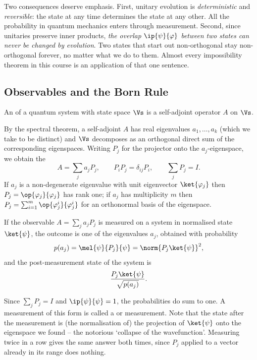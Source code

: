 Two consequences deserve emphasis. First, unitary evolution is \emph{deterministic} and \emph{reversible}: the state at any time determines the state at any other. All the probability in quantum mechanics enters through measurement. Second, since unitaries preserve inner products, \emph{the overlap $\ip{\psi}{\varphi}$ between two states can never be changed by evolution}. Two states that start out non-orthogonal stay non-orthogonal forever, no matter what we do to them. Almost every impossibility theorem in this course is an application of that one sentence.

\subsection{Observables and the Born Rule}

\begin{definition}[Observable]
	An  of a quantum system with state space $\Vs$ is a self-adjoint operator $A$ on $\Vs$.
\end{definition}

By the spectral theorem, a self-adjoint $A$ has real eigenvalues $a_1, \dots, a_k$ (which we take to be distinct) and $\Vs$ decomposes as an orthogonal direct sum of the corresponding eigenspaces. Writing $P_j$ for the projector onto the $a_j$-eigenspace, we obtain the 
$$A = \sum_j a_j P_j, \qquad P_iP_j = \delta_{ij}P_i, \qquad \sum_j P_j = I.$$
If $a_j$ is a non-degenerate eigenvalue with unit eigenvector $\ket{\varphi_j}$ then $P_j = \op{\varphi_j}{\varphi_j}$ has rank one; if $a_j$ has multiplicity $m$ then $P_j = \sum_{i=1}^m \op{\varphi_j^i}{\varphi_j^i}$ for an orthonormal basis of the eigenspace.

\begin{axiom}
	If the observable $A = \sum_j a_j P_j$ is measured on a system in normalised state $\ket{\psi}$, the outcome is one of the eigenvalues $a_j$, obtained with probability
	$$p(a_j) = \mel{\psi}{P_j}{\psi} = \norm{P_j \ket{\psi}}^2,$$
	and the post-measurement state of the system is
	$$\frac{P_j\ket{\psi}}{\sqrt{p(a_j)}}.$$
\end{axiom}

Since $\sum_j P_j = I$ and $\ip{\psi}{\psi} = 1$, the probabilities do sum to one. A measurement of this form is called a  or  measurement. Note that the state after the measurement is (the normalisation of) the projection of $\ket{\psi}$ onto the eigenspace we found -- the notorious `collapse of the wavefunction'. Measuring twice in a row gives the same answer both times, since $P_j$ applied to a vector already in its range does nothing.

